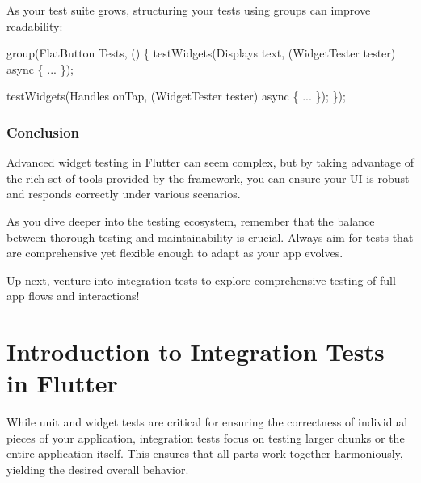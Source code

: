 \documentclass[
]{article}
\newenvironment{Shaded}{\begin{snugshade}}{\end{snugshade}}
\newcommand{\AttributeTok}[1]{\textcolor[rgb]{0.16,0.50,0.73}{#1}}
\newcommand{\NormalTok}[1]{\textcolor[rgb]{0.81,0.81,0.76}{#1}}
\newcommand{\OperatorTok}[1]{\textcolor[rgb]{0.81,0.81,0.76}{#1}}
\newcommand{\StringTok}[1]{\textcolor[rgb]{0.96,0.31,0.31}{#1}}
\begin{document}
As your test suite grows, structuring your tests using groups can
improve readability:

\begin{Shaded}
\begin{Highlighting}[]
\NormalTok{group(}\StringTok{\textquotesingle{}FlatButton Tests\textquotesingle{}}\OperatorTok{,}\NormalTok{ () }\OperatorTok{\{}
\NormalTok{  testWidgets(}\StringTok{\textquotesingle{}Displays text\textquotesingle{}}\OperatorTok{,}\NormalTok{ (WidgetTester tester) }\AttributeTok{async} \OperatorTok{\{}
    \OperatorTok{...}
  \OperatorTok{\}}\NormalTok{);}

\NormalTok{  testWidgets(}\StringTok{\textquotesingle{}Handles onTap\textquotesingle{}}\OperatorTok{,}\NormalTok{ (WidgetTester tester) }\AttributeTok{async} \OperatorTok{\{}
    \OperatorTok{...}
  \OperatorTok{\}}\NormalTok{);}
\OperatorTok{\}}\NormalTok{);}
\end{Highlighting}
\end{Shaded}

\subsubsection{Conclusion}\label{conclusion-7}

Advanced widget testing in Flutter can seem complex, but by taking
advantage of the rich set of tools provided by the framework, you can
ensure your UI is robust and responds correctly under various scenarios.

As you dive deeper into the testing ecosystem, remember that the balance
between thorough testing and maintainability is crucial. Always aim for
tests that are comprehensive yet flexible enough to adapt as your app
evolves.

Up next, venture into integration tests to explore comprehensive testing
of full app flows and interactions!

\section{Introduction to Integration Tests in
Flutter}\label{introduction-to-integration-tests-in-flutter}

While unit and widget tests are critical for ensuring the correctness of
individual pieces of your application, integration tests focus on
testing larger chunks or the entire application itself. This ensures
that all parts work together harmoniously, yielding the desired overall
behavior.
\end{document}
